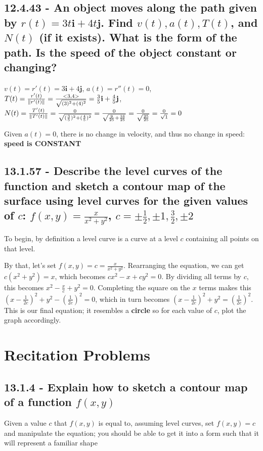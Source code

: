\documentclass{article}
\begin{document}
\subsection{12.4.43 - An object moves along the path given by $r(t) = 3t\textbf{i} + 4t\textbf{j}$.  Find $v(t), a(t), T(t)$, and $N(t)$ (if it exists).  What is the form of the path.  Is the speed of the object constant or changing?}
\par\noindent\Large $v(t) = r'(t) = 3\textbf{i} + 4\textbf{j}$, $a(t) = r''(t) = 0$, $T(t) = \frac{r'(t)}{\norm{r'(t)}} = \frac{<3, 4>}{\sqrt{(3)^{2} + (4)^{2}}} = \frac{3}{5}\textbf{i} + \frac{4}{5}\textbf{j}$, $\linebreak N(t) = \frac{T'(t)}{\norm{T'(t)}} = \frac{0}{\sqrt{(\frac{3}{5})^{2} + (\frac{4}{5})^{2}}} = \frac{0}{\sqrt{\frac{9}{25} + \frac{16}{25}}} = \frac{0}{\sqrt{\frac{25}{25}}} = \frac{0}{\sqrt{1}} = 0$\vspace{0.25cm}

\par\noindent\large Given $a(t) = 0$, there is no change in velocity, and thus no change in speed: \textbf{speed is CONSTANT}
\subsection{13.1.57 - Describe the level curves of the function and sketch a contour map of the surface using level curves for the given values of $c$: $f(x, y) = \frac{x}{x^{2} + y^{2}}$, $c = \pm\frac{1}{2}, \pm 1, \frac{3}{2}, \pm 2$}
\par\noindent\large To begin, by definition a level curve is a curve at a level $c$ containing all points on that level.
\par\noindent By that, let's set $f(x, y) = c = \frac{x}{x^{2} + y^{2}}$.  Rearranging the equation, we can get $c(x^{2} + y^{2}) = x$, which becomes $cx^{2} - x + cy^{2} = 0$.  By dividing all terms by $c$, this becomes $x^{2} - \frac{x}{c} + y^{2} = 0$.  Completing the square on the $x$ terms makes this $(x - \frac{1}{2c})^{2} + y^{2}  - (\frac{1}{2c})^{2} = 0$, which in turn becomes $(x - \frac{1}{2c})^{2} + y^{2} = (\frac{1}{2c})^{2}$.  This is our final equation; it resembles a \textbf{circle} so for each value of $c$, plot the graph accordingly.

\section{Recitation Problems}

\subsection{13.1.4 - Explain how to sketch a contour map of a function $f(x, y)$}
\par\noindent\large Given a value $c$ that $f(x, y)$ is equal to, assuming level curves, set $f(x, y) = c$ and manipulate the equation; you should be able to get it into a form such that it will represent a familiar shape
\end{document}
